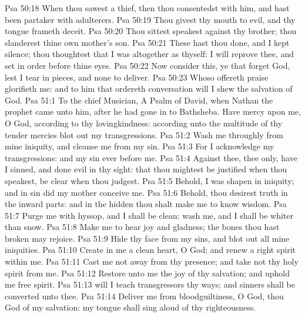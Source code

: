 \vs Psa 50:18 When thou sawest a thief, then thou consentedst with him, and hast been partaker with adulterers.
\vs Psa 50:19 Thou givest thy mouth to evil, and thy tongue frameth deceit.
\vs Psa 50:20 Thou sittest  speakest against thy brother; thou slanderest thine own mother's son.
\vs Psa 50:21 These  hast thou done, and I kept silence; thou thoughtest that I was altogether  as thyself:  I will reprove thee, and set  in order before thine eyes.
\vs Psa 50:22 Now consider this, ye that forget God, lest I tear  in pieces, and  none to deliver.
\vs Psa 50:23 Whoso offereth praise glorifieth me: and to him that ordereth  conversation  will I shew the salvation of God.
\vs Psa 51:1 To the chief Musician, A Psalm of David, when Nathan the prophet came unto him, after he had gone in to Bathsheba. Have mercy upon me, O God, according to thy lovingkindness: according unto the multitude of thy tender mercies blot out my transgressions.
\vs Psa 51:2 Wash me throughly from mine iniquity, and cleanse me from my sin.
\vs Psa 51:3 For I acknowledge my transgressions: and my sin  ever before me.
\vs Psa 51:4 Against thee, thee only, have I sinned, and done  evil in thy sight: that thou mightest be justified when thou speakest,  be clear when thou judgest.
\vs Psa 51:5 Behold, I was shapen in iniquity; and in sin did my mother conceive me.
\vs Psa 51:6 Behold, thou desirest truth in the inward parts: and in the hidden  thou shalt make me to know wisdom.
\vs Psa 51:7 Purge me with hyssop, and I shall be clean: wash me, and I shall be whiter than snow.
\vs Psa 51:8 Make me to hear joy and gladness;  the bones  thou hast broken may rejoice.
\vs Psa 51:9 Hide thy face from my sins, and blot out all mine iniquities.
\vs Psa 51:10 Create in me a clean heart, O God; and renew a right spirit within me.
\vs Psa 51:11 Cast me not away from thy presence; and take not thy holy spirit from me.
\vs Psa 51:12 Restore unto me the joy of thy salvation; and uphold me  free spirit.
\vs Psa 51:13  will I teach transgressors thy ways; and sinners shall be converted unto thee.
\vs Psa 51:14 Deliver me from bloodguiltiness, O God, thou God of my salvation:  my tongue shall sing aloud of thy righteousness.
